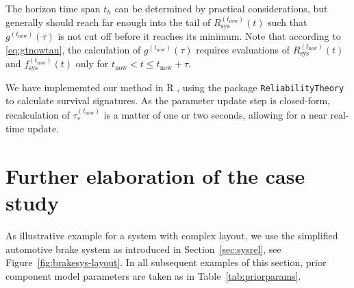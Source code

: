 \documentclass[authoryear]{elsarticle}
\def\tnow{t_\text{now}}
\newcommand{\Rsysnow}{R^{(t_\text{now})}_\text{sys}}
\newcommand{\fsysnow}{f^{(t_\text{now})}_\text{sys}}
\newcommand{\gnow}{g^{(\tnow)}}
\newcommand{\tausnow}{\tau_*^{(\tnow)}}
\begin{document}
The horizon time span $t_h$ can be determined by practical considerations,
but generally should reach far enough into the tail of $\Rsysnow(t)$
such that $\gnow(\tau)$ is not cut off before it reaches its minimum. %
Note that according to \eqref{eq:gtnowtau},
the calculation of $\gnow(\tau)$ requires
evaluations of $\Rsysnow(t)$ and $\fsysnow(t)$ only for $\tnow < t \le \tnow + \tau$.

We have implememted our method in \textsf{R} \citep{R},
using the package \texttt{ReliabilityTheory} \citep{2016:aslett-RT}
to calculate survival signatures.
As the parameter update step is closed-form,
recalculation of $\tausnow$ is a matter of one or two seconds,
allowing for a near real-time update.





\section{Further elaboration of the case study}
\label{sec:examples}

As illustrative example for a system with complex layout,
we use the simplified automotive brake system as introduced in Section~\ref{sec:sysrel},
see Figure~\ref{fig:brakesys-layout}.
In all subsequent examples of this section,
prior component model parameters are taken as in Table~\ref{tab:priorparams}.
\end{document}
